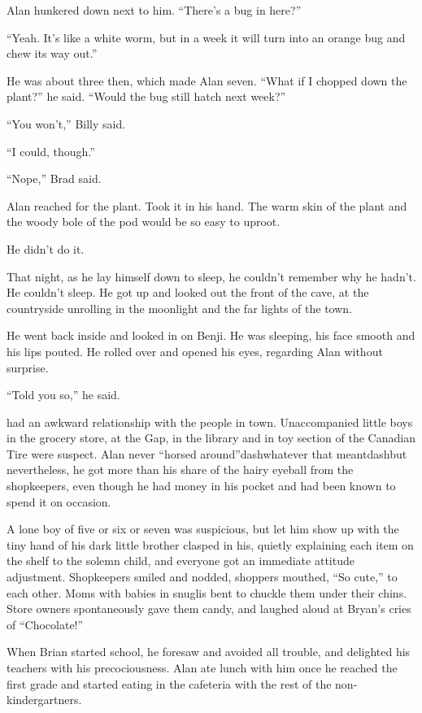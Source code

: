 Alan hunkered down next to him.  ``There's a bug in here?''

``Yeah.  It's like a white worm, but in a week it will turn into an
orange bug and chew its way out.''

He was about three then, which made Alan seven.  ``What if I chopped
down the plant?'' he said.  ``Would the bug still hatch next week?''

``You won't,'' Billy said.

``I could, though.''

``Nope,'' Brad said.

Alan reached for the plant.  Took it in his hand.  The warm skin of
the plant and the woody bole of the pod would be so easy to uproot.

He didn't do it.

That night, as he lay himself down to sleep, he couldn't remember why
he hadn't.  He couldn't sleep.  He got up and looked out the front of
the cave, at the countryside unrolling in the moonlight and the far
lights of the town.

He went back inside and looked in on Benji.  He was sleeping, his face
smooth and his lips pouted.  He rolled over and opened his eyes,
regarding Alan without surprise.

``Told you so,'' he said.

 had an awkward relationship with the people in town. 
Unaccompanied little boys in the grocery store, at the Gap, in the
library and in toy section of the Canadian Tire were suspect.  Alan
never ``horsed around''dash{}whatever that meantdash{}but nevertheless, he
got more than his share of the hairy eyeball from the shopkeepers,
even though he had money in his pocket and had been known to spend it
on occasion.

A lone boy of five or six or seven was suspicious, but let him show up
with the tiny hand of his dark little brother clasped in his, quietly
explaining each item on the shelf to the solemn child, and everyone
got an immediate attitude adjustment.  Shopkeepers smiled and nodded,
shoppers mouthed, ``So cute,'' to each other.  Moms with babies in
snuglis bent to chuckle them under their chins.  Store owners
spontaneously gave them candy, and laughed aloud at Bryan's cries of
``Chocolate!''

When Brian started school, he foresaw and avoided all trouble, and
delighted his teachers with his precociousness.  Alan ate lunch with
him once he reached the first grade and started eating in the
cafeteria with the rest of the non-kindergartners.

